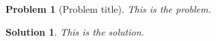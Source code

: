 \documentclass[UTF8,10pt,a4paper]{article}
\theoremstyle{Problem}
\newtheorem{prob}{Problem}
\theoremstyle{Solution}
\newtheorem*{sol}{Solution}
\begin{document}
\thispagestyle{FirstPageStyle}
\begin{prob}[Problem title]
    This is the problem.
\end{prob}
\begin{sol}
    This is the solution.
\end{sol}
\end{document}
